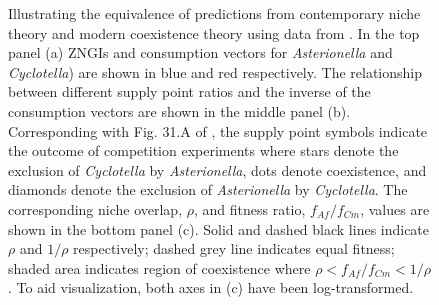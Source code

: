 \newpage
\begin{figure}[h!]
\centering
{}
\caption[Illustrating the equivalence of predictions from contemporary niche theory and modern coexistence theory using data from \citet{Tilman1977, tilman1982}.]
	{\hspace{1mm} Illustrating the equivalence of predictions from contemporary niche theory and modern coexistence theory using data from \citet{Tilman1977, tilman1982}. In the top panel (a) ZNGIs and consumption vectors for \textit{Asterionella} and \textit{Cyclotella}) are shown in blue and red respectively. The relationship between different supply point ratios and the inverse of the consumption vectors are shown in the middle panel (b). Corresponding with Fig. 31.A of \citet{tilman1982}, the supply point symbols indicate the outcome of competition experiments where stars denote the exclusion of \textit{Cyclotella} by \textit{Asterionella}, dots denote coexistence, and diamonds denote the exclusion of \textit{Asterionella} by \textit{Cyclotella}. The corresponding niche overlap, $\rho$, and fitness ratio, $f_{Af}/f_{Cm}$, values are shown in the bottom panel (c). Solid and dashed black lines indicate $\rho$ and $1/\rho$ respectively; dashed grey line indicates equal fitness; shaded area indicates region of coexistence where  $\rho < f_{Af}/f_{Cm} < 1/\rho$. To aid visualization, both axes in (c) have been log-transformed.}
\label{fig:Box2-fig-Tilman}
\end{figure}



